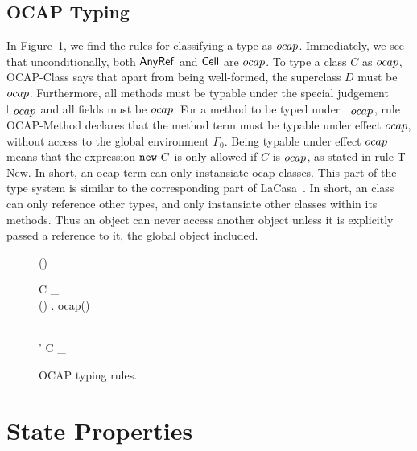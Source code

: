 \subsection{OCAP Typing}%
\label{sub:ocap_typing}

In Figure~\ref{fig:ocap_typing}, we find the rules for classifying a type as $\mbox{$ocap$}$.
Immediately, we see that unconditionally, both $\mbox{$\mathsf{AnyRef}$}$ and $\mbox{$\mathsf{Cell}$}$ are
$\mbox{$ocap$}$. To type a class $C$ as $\mbox{$ocap$}$, {\sc OCAP-Class} says that apart from being
well-formed, the superclass $D$ must be $\mbox{$ocap$}$. Furthermore, all methods must
be typable under the special judgement $\vdash_{\mbox{$ocap$}}$ and all fields must be
$\mbox{$ocap$}$.  For a method to be typed under $\vdash_{\mbox{$ocap$}}$, rule {\sc
OCAP-Method} declares that the method term must be typable under effect $\mbox{$ocap$}$,
without access to the global environment $\Gamma_0$. Being typable under effect
$\mbox{$ocap$}$ means that the expression $\mbox{\mdseries\texttt{new}~$C$}$ is only allowed if $C$ is $\mbox{$ocap$}$, as
stated in rule {\sc T-New}. In short, an ocap term can only instansiate ocap
classes. This part of the type system is similar to the corresponding part of
LaCasa~\parencite{conf/oopsla/HallerL16}. In short, an \ocap{} class can only
reference other \ocap{} types, and only instansiate other \ocap{} classes within
its methods. Thus an \ocap{} object can never access another object unless it is
explicitly passed a reference to it, the global object included.

\begin{figure}
  {\ocap{(\AnyRefType{})}}

  \RuleSpace{}

  {\ocap(\CellType)}

  \RuleSpace{}

  { \andalso C \vdash_{\ocap}  \\
  \forall () \in {}. \: ocap(\sigma)}
  {}

  \RuleSpace{}

  { \\
  \tau' \stof \tau}
  {C \vdash_{\ocap} }
  \caption{\RACL{} OCAP typing rules.}
  \label{fig:ocap_typing}
\end{figure}


\section{State Properties}
\label{sec:properties}

